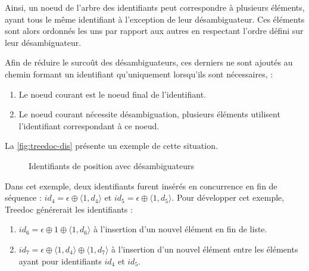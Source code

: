 Ainsi, un noeud de l'arbre des identifiants peut correspondre à plusieurs éléments, ayant tous le même identifiant à l'exception de leur désambiguateur.
Ces éléments sont alors ordonnés les uns par rapport aux autres en respectant l'ordre défini sur leur désambiguateur.

Afin de réduire le surcoût des désambiguateurs, ces derniers ne sont ajoutés au chemin formant un identifiant qu'uniquement lorsqu'ils sont nécessaires, \ie :
\begin{enumerate}
  \item Le noeud courant est le noeud final de l'identifiant.
  \item Le noeud courant nécessite désambiguation, \ie plusieurs éléments utilisent l'identifiant correspondant à ce noeud.
\end{enumerate}
La \autoref{fig:treedoc-dis} présente un exemple de cette situation.
\begin{figure}[!ht]

  \centering
  \caption{Identifiants de position avec désambiguateurs}
  \label{fig:treedoc-dis}
\end{figure}
Dans cet exemple, deux identifiants furent insérés en concurrence en fin de séquence : $id_4 = \epsilon \oplus \langle 1,d_4 \rangle$ et $id_5 = \epsilon \oplus \langle 1,d_5 \rangle$.
Pour développer cet exemple, Treedoc générerait les identifiants :
\begin{enumerate}
  \item $id_6 = \epsilon \oplus 1 \oplus \langle 1,d_6 \rangle$ à l'insertion d'un nouvel élément en fin de liste.
  \item $id_7 = \epsilon \oplus \langle 1,d_4 \rangle \oplus \langle 1,d_7 \rangle$ à l'insertion d'un nouvel élément entre les éléments ayant pour identifiants $id_4$ et $id_5$.
\end{enumerate}

